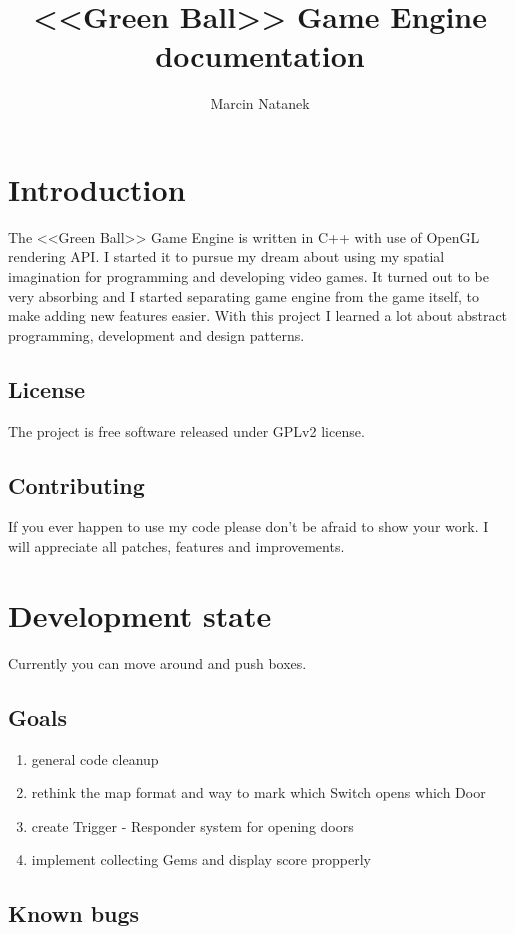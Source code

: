 \documentclass[11pt,a4paper,oneside]{report}
\title{<<Green Ball>> Game Engine documentation}
\author{Marcin Natanek}
\begin{document}
\maketitle
\pagebreak
\tableofcontents
\pagebreak

\chapter{Introduction}
The <<Green Ball>> Game Engine is written in C++ with use of OpenGL rendering API. I started it to pursue my dream about using my spatial imagination for programming and developing video games. It turned out to be very absorbing and I started separating game engine from the game itself, to make adding new features easier. With this project I learned a lot about abstract programming, development and design patterns.

\section{License}
The project is free software released under GPLv2 license.

\section{Contributing}
If you ever happen to use my code please don't be afraid to show your work. I will appreciate all patches, features and improvements.

\chapter{Development state}
Currently you can move around and push boxes.
\section{Goals}
\begin{enumerate}
	\item general code cleanup
	\item rethink the map format and way to mark which Switch opens which Door
	\item create Trigger - Responder system for opening doors
	\item implement collecting Gems and display score propperly
\end{enumerate}
\section{Known bugs}
\end{document}
